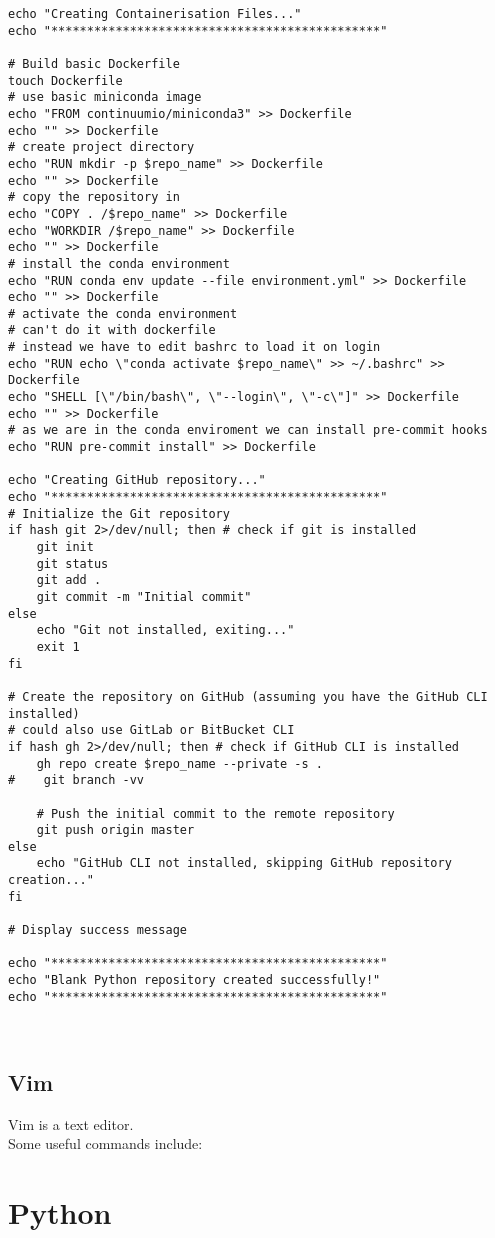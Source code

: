 \documentclass[12pt,a4paper]{article}
\begin{document}
\begin{lstlisting}
echo "Creating Containerisation Files..."
echo "**********************************************"

# Build basic Dockerfile
touch Dockerfile
# use basic miniconda image
echo "FROM continuumio/miniconda3" >> Dockerfile
echo "" >> Dockerfile
# create project directory
echo "RUN mkdir -p $repo_name" >> Dockerfile
echo "" >> Dockerfile
# copy the repository in
echo "COPY . /$repo_name" >> Dockerfile
echo "WORKDIR /$repo_name" >> Dockerfile
echo "" >> Dockerfile
# install the conda environment
echo "RUN conda env update --file environment.yml" >> Dockerfile
echo "" >> Dockerfile
# activate the conda environment
# can't do it with dockerfile
# instead we have to edit bashrc to load it on login
echo "RUN echo \"conda activate $repo_name\" >> ~/.bashrc" >> Dockerfile
echo "SHELL [\"/bin/bash\", \"--login\", \"-c\"]" >> Dockerfile
echo "" >> Dockerfile
# as we are in the conda enviroment we can install pre-commit hooks
echo "RUN pre-commit install" >> Dockerfile

echo "Creating GitHub repository..."
echo "**********************************************"
# Initialize the Git repository
if hash git 2>/dev/null; then # check if git is installed
    git init
    git status
    git add .
    git commit -m "Initial commit"
else
    echo "Git not installed, exiting..."
    exit 1
fi

# Create the repository on GitHub (assuming you have the GitHub CLI installed)
# could also use GitLab or BitBucket CLI
if hash gh 2>/dev/null; then # check if GitHub CLI is installed
    gh repo create $repo_name --private -s .
#    git branch -vv

    # Push the initial commit to the remote repository
    git push origin master
else
    echo "GitHub CLI not installed, skipping GitHub repository creation..."
fi

# Display success message

echo "**********************************************"
echo "Blank Python repository created successfully!"
echo "**********************************************"

    
\end{lstlisting}

\subsection{Vim}
Vim is a text editor.\\
Some useful commands include:

\section{Python}
\end{document}
